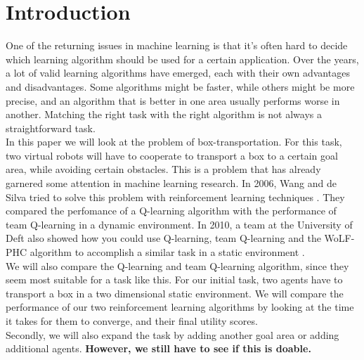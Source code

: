 \section{Introduction}
One of the returning issues in machine learning is that it's often hard to decide which learning algorithm should be used for a certain application. Over the years, a lot of valid learning algorithms have emerged, each with their own advantages and disadvantages. Some algorithms might be faster, while others might be more precise, and an algorithm that is better in one area usually performs worse in another. Matching the right task with the right algorithm is not always a straightforward task.\\
In this paper we will look at the problem of box-transportation.  For this task, two virtual robots will have to cooperate to transport a box to a certain goal area, while avoiding certain obstacles. This is a problem that has already garnered some attention in machine learning research. In 2006, Wang and de Silva tried to solve this problem with reinforcement learning techniques \cite{wang2006}. They compared the perfomance of a Q-learning algorithm with the performance of team Q-learning in a dynamic environment. In 2010, a team at the University of Deft also showed how you could use Q-learning, team Q-learning and the WoLF-PHC algorithm to accomplish a similar task in a static environment \cite{busoniu2010}.\\
We will also compare the Q-learning and team Q-learning algorithm, since they seem most suitable for a task like this. For our initial task, two agents have to transport a box in a two dimensional static environment. We will compare the performance of our two reinforcement learning algorithms by looking at the time it takes for them to converge, and their final utility scores.\\
Secondly, we will also expand the task by adding another goal area or adding additional agents. \textbf{However, we still have to see if this is doable.}
 
